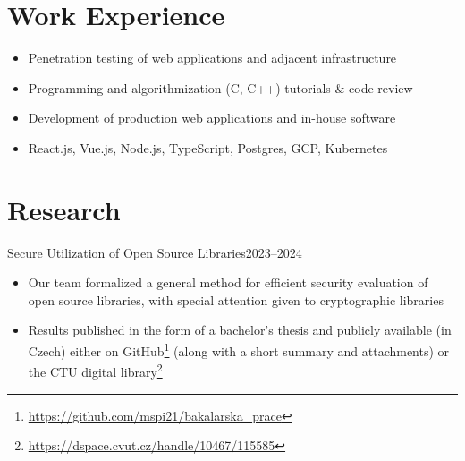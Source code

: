 \documentclass{customcv}
\begin{document}

\section{Work Experience}
    \begin{itemize}
        \item Penetration testing of web applications and adjacent infrastructure
    \end{itemize}

    \begin{itemize}
        \item Programming and algorithmization (C, C++) tutorials \& code review
    \end{itemize}

    \begin{itemize}
        \item Development of production web applications and in-house software
        
        \item React.js, Vue.js, Node.js, TypeScript, Postgres, GCP, Kubernetes
    \end{itemize}

\section{Research}
        {Secure Utilization of Open Source Libraries}{2023--2024}
    \begin{itemize}
        \item Our team formalized a general method for efficient security evaluation of open source libraries,
        with special attention given to cryptographic libraries
        
        \item Results published in the form of a bachelor’s thesis and publicly available (in Czech) either
        on GitHub\footnote{\url{https://github.com/mspi21/bakalarska_prace}}
        (along with a short summary and attachments) or the CTU digital library\footnote{\url{https://dspace.cvut.cz/handle/10467/115585}}
    \end{itemize}
\end{document}
